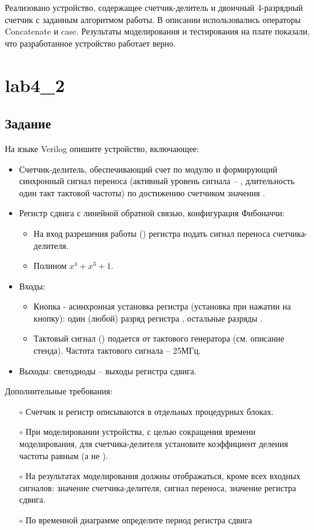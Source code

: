 Реализовано устройство, содержащее счетчик-делитель и двоичный 4-разрядный счетчик с заданным алгоритмом работы. В описании использовались операторы Concatenate и case. Результаты моделирования и тестирования на плате показали, что разработанное устройство работает верно.

\newpage

\section{lab4\_2}

\subsection{Задание}

На языке Verilog опишите устройство, включающее:
\begin{itemize}
	\item Счетчик-делитель, обеспечивающий счет по модулю  и формирующий синхронный сигнал переноса (активный уровень сигнала -- , длительность один такт тактовой частоты) по достижению счетчиком значения .
	\item Регистр сдвига с линейной обратной связью, конфигурация Фибоначчи:
		\begin{itemize}
			\item На вход разрешения работы () регистра подать сигнал переноса счетчика-делителя.
			\item Полином $x^4 + x^3 + 1$.
		\end{itemize}

	\item Входы:
		\begin{itemize}
			\item Кнопка  - асинхронная установка регистра (установка при нажатии на кнопку): один (любой) разряд регистра , остальные разряды . 	
			\item Тактовый сигнал () подается от тактового генератора (см. описание стенда). Частота тактового сигнала – 25МГц.
		\end{itemize}		
	\item Выходы: светодиоды  -- выходы регистра сдвига.
\end{itemize}

Дополнительные требования:
\begin{itemize}
	\item[$\circ$] Счетчик и регистр описываются в отдельных процедурных блоках.
	\item[$\circ$] При моделировании устройства, с целью сокращения времени моделирования, для счетчика-делителя установите коэффициент деления частоты равным  (а не ).
	\item[$\circ$] На результатах моделирования должны отображаться, кроме всех входных сигналов: значение счетчика-делителя, сигнал переноса, значение регистра сдвига.
	\item[$\circ$] По временной диаграмме определите период регистра сдвига
\end{itemize}

